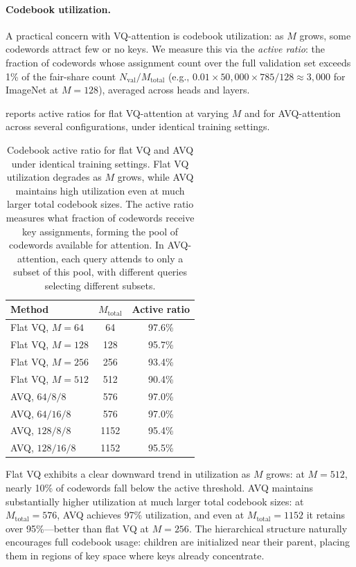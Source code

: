 \paragraph{Codebook utilization.}
\label{app:codebook_utilization}
A practical concern with VQ-attention is codebook utilization: as $M$ grows, some codewords attract few or no keys. We measure this via the \emph{active ratio}: the fraction of codewords whose assignment count over the full validation set exceeds 1\% of the fair-share count $N_{\text{val}}/M_{\text{total}}$ (e.g., $0.01 \times 50{,}000 \times 785 / 128 \approx 3{,}000$ for ImageNet at $M{=}128$), averaged across heads and layers.

 reports active ratios for flat VQ-attention at varying $M$ and for AVQ-attention across several configurations, under identical training settings.

\begin{table}[h]
\centering
\caption{Codebook active ratio for flat VQ and AVQ under identical training settings. Flat VQ utilization degrades as $M$ grows, while AVQ maintains high utilization even at much larger total codebook sizes. The active ratio measures what fraction of codewords receive key assignments, forming the pool of codewords available for attention. In AVQ-attention, each query attends to only a subset of this pool, with different queries selecting different subsets.}
\label{tab:active_ratio}
\begin{tabular}{lcc}
\toprule
\textbf{Method} & $M_{\text{total}}$ & \textbf{Active ratio} \\
\midrule
Flat VQ, $M{=}64$   & 64   & 97.6\% \\
Flat VQ, $M{=}128$  & 128  & 95.7\% \\
Flat VQ, $M{=}256$  & 256  & 93.4\% \\
Flat VQ, $M{=}512$  & 512  & 90.4\% \\
\midrule
AVQ, $64/8/8$    & 576  & 97.0\% \\
AVQ, $64/16/8$   & 576  & 97.0\% \\
AVQ, $128/8/8$   & 1152 & 95.4\% \\
AVQ, $128/16/8$  & 1152 & 95.5\% \\
\bottomrule
\end{tabular}
\end{table}

Flat VQ exhibits a clear downward trend in utilization as $M$ grows: at $M{=}512$, nearly 10\% of codewords fall below the active threshold. AVQ maintains substantially higher utilization at much larger total codebook sizes: at $M_{\text{total}}{=}576$, AVQ achieves 97\% utilization, and even at $M_{\text{total}}{=}1152$ it retains over 95\%---better than flat VQ at $M{=}256$. The hierarchical structure naturally encourages full codebook usage: children are initialized near their parent, placing them in regions of key space where keys already concentrate.

